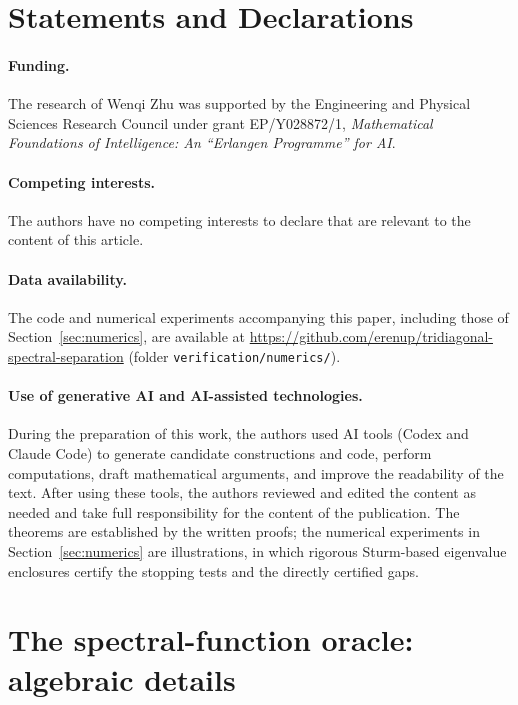 \documentclass[10pt,a4paper]{article}
\begin{document}
\section*{Statements and Declarations}
\paragraph{Funding.}
The research of Wenqi Zhu was supported by the Engineering and Physical
Sciences Research Council under grant EP/Y028872/1, \emph{Mathematical
Foundations of Intelligence: An ``Erlangen Programme'' for AI}.

\paragraph{Competing interests.}
The authors have no competing interests to declare that are relevant to
the content of this article.

\paragraph{Data availability.}
The code and numerical experiments accompanying this paper, including
those of Section~\ref{sec:numerics}, are available at
\url{https://github.com/erenup/tridiagonal-spectral-separation}
(folder \texttt{verification/numerics/}).

\paragraph{Use of generative AI and AI-assisted technologies.}
During the preparation of this work, the authors used AI tools (Codex and Claude Code) to generate candidate constructions and code, perform computations, draft mathematical arguments, and improve the readability of the text. After using these
tools, the authors reviewed and edited the content as needed and take full
responsibility for the content of the publication. The theorems are
established by the written proofs; the numerical experiments in
Section~\ref{sec:numerics} are illustrations, in which rigorous
Sturm-based eigenvalue enclosures certify the stopping tests and the
directly certified gaps.

\appendix
\section{The spectral-function oracle: algebraic details}
\label{app:oracle}
\end{document}
